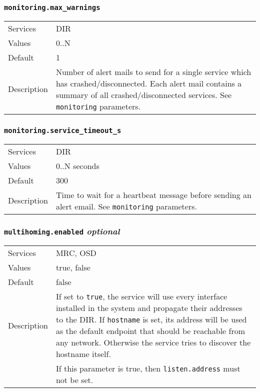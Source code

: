 \documentclass[a4paper,10pt]{book}
\begin{document}
\subsubsection{\texttt{monitoring.max\_warnings}}
\begin{tabular}{lp{10cm}}
 Services & DIR\\
 Values   & 0..N \\
 Default  & 1\\
 Description & Number of alert mails to send for a single service which has crashed/disconnected. Each alert mail contains a summary of all crashed/disconnected services. See \texttt{monitoring} parameters.
\end{tabular}

\subsubsection{\texttt{monitoring.service\_timeout\_s}}
\begin{tabular}{lp{10cm}}
 Services & DIR\\
 Values   & 0..N seconds \\
 Default  & 300 \\
 Description & Time to wait for a heartbeat message before sending an alert email. See \texttt{monitoring} parameters.
\end{tabular}

\subsubsection{\texttt{multihoming.enabled} \textit{optional}}
\label{option:multihoming.enabled}
\begin{tabular}{lp{10cm}}
 Services & MRC, OSD\\
 Values   & true, false\\
 Default  & false\\
 Description & If set to \texttt{true}, the service will use every interface installed in the system and propagate their addresses to the DIR. If \texttt{hostname} is set, its address will be used as the default endpoint that should be reachable from any network. Otherwise the service tries to discover the hostname itself.\\
 & If this parameter is true, then \texttt{listen.address} must not be set.
\end{tabular}
\end{document}
